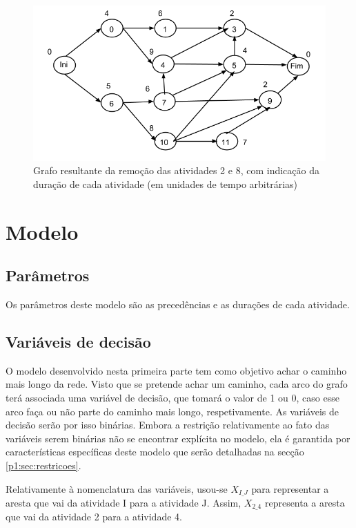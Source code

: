 \begin{figure}[<+htpb+>]
	\centering
	\includegraphics[scale=0.5]{./img/p1_rede_com_duracoes}
	\caption{Grafo resultante da remoção das atividades 2 e 8, com indicação da duração de cada atividade (em unidades de tempo arbitrárias)}
	\label{p1:fig:rede_com_duracoes}
\end{figure}

\newpage
\section{Modelo}

\subsection{Parâmetros}

Os parâmetros deste modelo são as precedências e as durações de cada atividade.

\subsection{Variáveis de decisão}
\label{p1:subsec:vardec}

O modelo desenvolvido nesta primeira parte tem como objetivo achar o caminho
mais longo da rede. Visto que se pretende achar um caminho, cada arco do grafo terá
associada uma variável de decisão, que tomará o valor de 1 ou 0, caso esse arco
faça ou não parte do caminho mais longo, respetivamente. As variáveis de
decisão serão por isso binárias. Embora a restrição relativamente ao fato das variáveis serem binárias não se encontrar explícita no modelo, ela é garantida por características específicas deste modelo que serão detalhadas na secção \ref{p1:sec:restricoes}.

Relativamente à nomenclatura das variáveis,
usou-se $X_{I\_J}$ para representar a aresta que vai da atividade I para
a atividade J. Assim, $X_{2\_4}$ representa a aresta que vai da atividade 2 para
a atividade 4.

